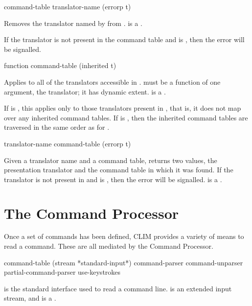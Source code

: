  {command-table translator-name
                                                            \key (errorp t)}

Removes the translator named by  from .
 is a .

If the translator is not present in the command table and  is
, then the  error will be signalled.


 {function command-table \key (inherited t)}

Applies  to all of the translators accessible in
.   must be a function of one argument, the
translator; it has dynamic extent.   is a . 

If  is , this applies  only to
those translators present in , that is, it does
not map over any inherited command tables.  If  is
, then the inherited command tables are traversed in the same
order as for .


 {translator-name command-table \key (errorp t)}

Given a translator name and a command table, returns two values, the
presentation translator and the command table in which it was found.  If the
translator is not present in  and  is
, then the  error will be signalled.
 is a .


\section {The Command Processor}

Once a set of commands has been defined, CLIM provides a variety of means to
read a command.  These are all mediated by the Command Processor.


 {command-table 
                       \key (stream *standard-input*)
                            command-parser command-unparser partial-command-parser
                            use-keystrokes} 

 is the standard interface used to read a command line.
 is an extended input stream, and  is a
.

